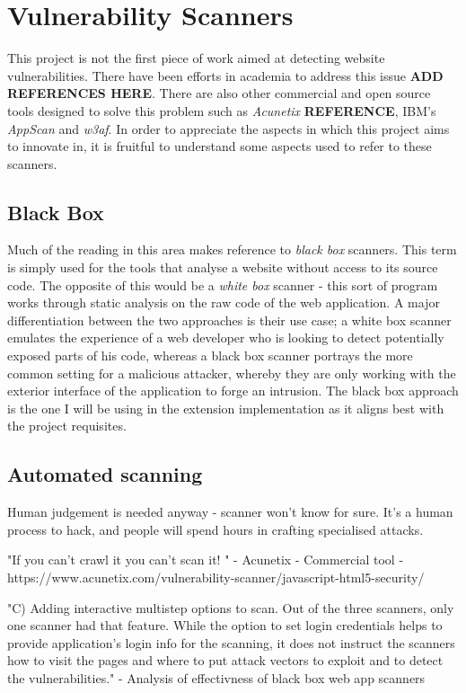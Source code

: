 \section{Vulnerability Scanners}

This project is not the first piece of work aimed at detecting website vulnerabilities. There have been efforts in academia to address this issue \textbf{ADD REFERENCES HERE}. There are also other commercial and open source tools designed to solve this problem such as \textit{Acunetix} \textbf{REFERENCE}, IBM's \textit{AppScan} and \textit{w3af}. In order to appreciate the aspects in which this project aims to innovate in, it is fruitful to understand some aspects used to refer to these scanners.

\subsection{Black Box}

Much of the reading in this area makes reference to \textit{black box} scanners. This term is simply used for the tools that analyse a website without access to its source code. The opposite of this would be a \textit{white box} scanner - this sort of program works through static analysis on the raw code of the web application. A major differentiation between the two approaches is their use case; a white box scanner emulates the experience of a web developer who is looking to detect potentially exposed parts of his code, whereas a black box scanner portrays the more common setting for a malicious attacker, whereby they are only working with the exterior interface of the application to forge an intrusion. The black box approach is the one I will be using in the extension implementation as it aligns best with the project requisites.

\subsection{Automated scanning}
 
 
 Human judgement is needed anyway - scanner won't know for sure. It's a human process to hack, and people will spend hours in crafting specialised attacks. 
 
 "If you can’t crawl it you can’t scan it! " - Acunetix - Commercial tool - https://www.acunetix.com/vulnerability-scanner/javascript-html5-security/
 
 
 "C) Adding interactive multistep options to scan. Out of the three scanners, only one scanner had that feature. While the option to set login credentials helps to provide application’s login info for the scanning, it does not instruct the scanners how to visit the pages and where to put attack vectors to exploit and to detect the vulnerabilities." - Analysis of effectivness of black box web app scanners 
 
